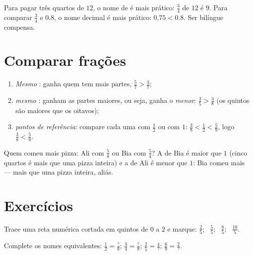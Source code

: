 \begin{example}\label{ex:g5:fractions:choose}
Para pagar três quartos de $12$, o nome de  é mais prático:
$\frac34$ de $12$ é $9$. Para comparar $\frac34$ e $0.8$, o nome
decimal é mais prático: $0.75 < 0.8$. Ser bilíngue compensa.
\end{example}

\section{Comparar frações}

\begin{method}\label{met:g5:fractions:compare}
\begin{enumerate}
  \item \emph{Mesmo }: ganha quem tem mais partes,
        $\frac57 > \frac37$;
  \item \emph{mesmo }: ganham as partes maiores, ou seja,
        ganha o  \emph{menor}: $\frac35 > \frac38$ (os
        quintos são maiores que os oitavos);
  \item \emph{pontos de referência}: compare cada uma com $\frac12$
        ou com $1$: $\frac38 < \frac12 < \frac59$, logo $\frac38 <
        \frac59$.
\end{enumerate}
\end{method}

\begin{example}\label{ex:g5:fractions:compare}
Quem comeu mais pizza: Ali com $\frac58$ ou Bia com $\frac54$? A
 de Bia é maior que $1$ (cinco quartos é mais que uma pizza
inteira) e a de Ali é menor que $1$: Bia comeu mais --- mais que uma
pizza inteira, aliás.
\end{example}

\section{Exercícios}

\begin{exercise}[$\star$]\label{exo:g5:fractions:1}
Trace uma reta numérica cortada em quintos de $0$ a $2$ e marque:
$\frac25$; \ $\frac55$; \ $\frac85$; \ $\frac{10}{5}$.
\end{exercise}

\begin{exercise}[$\star$]\label{exo:g5:fractions:2}
Complete os nomes equivalentes:
$\frac12 = \frac{?}{8}$; \quad
$\frac34 = \frac{?}{8}$; \quad
$\frac{2}{5} = \frac{4}{?}$; \quad
$\frac{6}{9} = \frac{2}{?}$.
\end{exercise}

